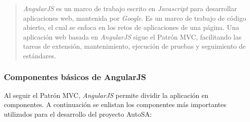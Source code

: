 \begin{quote}
	\textit{AngularJS} es un marco de trabajo escrito en \textit{Javascript} para desarrollar aplicaciones web, mantenida por \textit{Google}. Es un marco de trabajo de código abierto, el cual se enfoca en los retos de aplicaciones de una página. Una aplicación web basada en \textit{AngularJS} sigue el Patrón MVC, facilitando las tareas de extensión, mantenimiento, ejecución de pruebas y seguimiento de estándares\cite{FullStackAngularJS}.
\end{quote}

\subsubsection{Componentes básicos de AngularJS}
Al seguir el Patrón MVC, \textit{AngularJS} permite dividir la aplicación en componentes. A continuación se enlistan los componentes más importantes utilizados para el desarrollo del proyecto AutoSA\cite{FullStackAngularJS, LearningAngularJS, AngularJSEssentials}:
